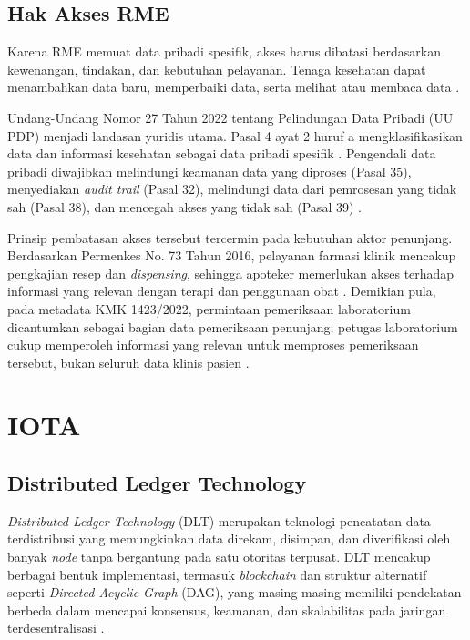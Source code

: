 \documentclass[bahasa, 12pt, a4paper, onecolumn, oneside, final]{report}
\begin{document}
\subsection{Hak Akses RME}
\label{subsec:hak-akses-rme}

Karena RME memuat data pribadi spesifik, akses harus dibatasi berdasarkan kewenangan, tindakan, dan kebutuhan pelayanan. Tenaga kesehatan dapat menambahkan data baru, memperbaiki data, serta melihat atau membaca data \autocite{permenkes24_2022}.

Undang-Undang Nomor 27 Tahun 2022 tentang Pelindungan Data Pribadi (UU PDP) menjadi landasan yuridis utama. Pasal 4 ayat 2 huruf a mengklasifikasikan data dan informasi kesehatan sebagai data pribadi spesifik \autocite{uu27-2022-pdp}. Pengendali data pribadi diwajibkan melindungi keamanan data yang diproses (Pasal 35), menyediakan \textit{audit trail} (Pasal 32), melindungi data dari pemrosesan yang tidak sah (Pasal 38), dan mencegah akses yang tidak sah (Pasal 39) \autocite{uu27-2022-pdp}.

Prinsip pembatasan akses tersebut tercermin pada kebutuhan aktor penunjang. Berdasarkan Permenkes No. 73 Tahun 2016, pelayanan farmasi klinik mencakup pengkajian resep dan \textit{dispensing}, sehingga apoteker memerlukan akses terhadap informasi yang relevan dengan terapi dan penggunaan obat \autocite{permenkes73_2016}. Demikian pula, pada metadata KMK 1423/2022, permintaan pemeriksaan laboratorium dicantumkan sebagai bagian data pemeriksaan penunjang; petugas laboratorium cukup memperoleh informasi yang relevan untuk memproses pemeriksaan tersebut, bukan seluruh data klinis pasien \autocite{kemenkes1423-2022}.
\section{IOTA}
\label{sec:iota}

\subsection{Distributed Ledger Technology}
\label{subsec:dlt}

\textit{Distributed Ledger Technology} (DLT) merupakan teknologi pencatatan data terdistribusi yang memungkinkan data direkam, disimpan, dan diverifikasi oleh banyak \textit{node} tanpa bergantung pada satu otoritas terpusat. DLT mencakup berbagai bentuk implementasi, termasuk \textit{blockchain} dan struktur alternatif seperti \textit{Directed Acyclic Graph} (DAG), yang masing-masing memiliki pendekatan berbeda dalam mencapai konsensus, keamanan, dan skalabilitas pada jaringan terdesentralisasi \autocite{savadatti2025survey}.
\end{document}
